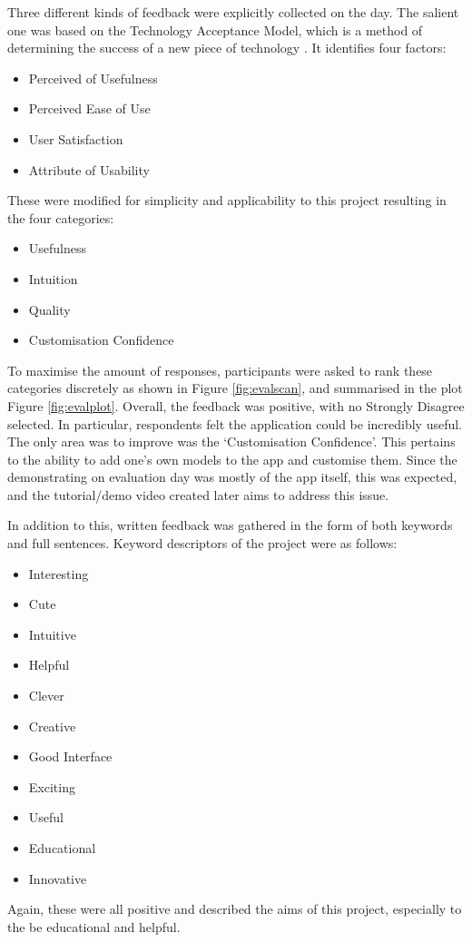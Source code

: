 \documentclass[12pt, a4paper]{article}
\begin{document}
Three different kinds of feedback were explicitly collected on the day. The salient one was based on the Technology Acceptance Model, which is a method of determining the success of a new piece of technology \cite{testing:acceptancemodel}. It identifies four factors:
\begin{itemize}
    \item Perceived of Usefulness
    \item Perceived Ease of Use
    \item User Satisfaction
    \item Attribute of Usability
\end{itemize}
These were modified for simplicity and applicability to this project resulting in the four categories:
\begin{itemize}
    \item Usefulness
    \item Intuition
    \item Quality
    \item Customisation Confidence
\end{itemize}
To maximise the amount of responses, participants were asked to rank these categories discretely as shown in Figure \ref{fig:evalscan}, and summarised in the plot Figure \ref{fig:evalplot}. Overall, the feedback was positive, with no Strongly Disagree selected. In particular, respondents felt the application could be incredibly useful. The only area was to improve was the `Customisation Confidence'. This pertains to the ability to add one's own models to the app and customise them. Since the demonstrating on evaluation day was mostly of the app itself, this was expected, and the tutorial/demo video created later aims to address this issue.

In addition to this, written feedback was gathered in the form of both keywords and full sentences. Keyword descriptors of the project were as follows:
\begin{multicols}{2}
\begin{itemize}
    \item Interesting
    \item Cute
    \item Intuitive
    \item Helpful
    \item Clever
    \item Creative
\end{itemize}
\columnbreak
\begin{itemize}
    \item Good Interface
    \item Exciting
    \item Useful
    \item Educational 
    \item Innovative
\end{itemize}
\vfill\null
\end{multicols}
Again, these were all positive and described the aims of this project, especially to the be educational and helpful.
\end{document}
